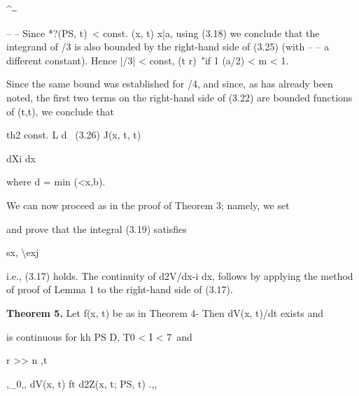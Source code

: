 \textasciicircum{}\textasciitilde{}

\begin{ocrformula}
--                 --
Since              *?(PS, t)\ < const. \x
\C(x, t)                         x|a, using (3.18) we conclude   that
the integrand   of /3 is also bounded    by the right-hand   side of (3.25) (with
--           --
a different constant).   Hence   |/3| < const, (t     r)~"if 1    (a/2) < m < 1.
\end{ocrformula}

Since the same bound was established for /4, and since, as has already been noted, the first two terms on the right-hand side of (3.22) are bounded functions of (t,t), we conclude that

\begin{ocrformula}
th2                                   const.            L         d              \
(3.26)                              J(x, t, t)
\end{ocrformula}

dXi dx

\begin{ocrformula}
where       d = min         (<x,b).
\end{ocrformula}

We can now proceed as in the proof of Theorem 3; namely, we set

\begin{ocrformula}
and     prove      that the integral (3.19) satisfies
\end{ocrformula}

sx, \textbackslash{}exj

\begin{ocrformula}
i.e., (3.17) holds. The continuity  of d2V/dx-i dx, follows by applying                                                 the
method    of proof of Lemma  1 to the right-hand  side of (3.17).
\end{ocrformula}

\medskip\noindent\textbf{Theorem 5.} Let f(x, t) be as in Theorem 4- Then dV(x, t)/dt exists and

\begin{ocrformula}
is continuous          for kh PS D, T0 < I < 7\, and
\end{ocrformula}

r >> n ,t

\begin{ocrformula}
,_0,,            dV(x,       t)                          ft                               d2Z(x, t; PS, t) .,,
\end{ocrformula}

